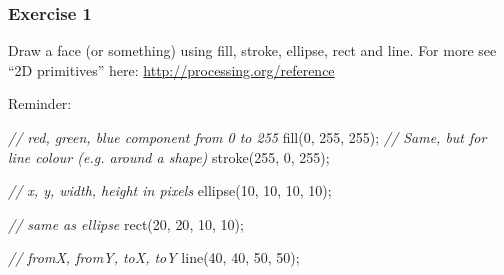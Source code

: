 \documentclass[ignorenonframetext,]{beamer}
\newenvironment{Shaded}{}{}
\newcommand{\DecValTok}[1]{\textcolor[rgb]{0.25,0.63,0.44}{{#1}}}
\newcommand{\CommentTok}[1]{\textcolor[rgb]{0.38,0.63,0.69}{\textit{{#1}}}}
\newcommand{\FunctionTok}[1]{\textcolor[rgb]{0.02,0.16,0.49}{{#1}}}
\newcommand{\NormalTok}[1]{{#1}}
\begin{document}
\begin{frame}[fragile]\frametitle{Exercise 1}

Draw a face (or something) using fill, stroke, ellipse, rect and line.
For more see ``2D primitives'' here:
\url{http://processing.org/reference}

Reminder:

\begin{Shaded}
\begin{Highlighting}[]
\CommentTok{// red, green, blue component from 0 to 255}
\FunctionTok{fill}\NormalTok{(}\DecValTok{0}\NormalTok{, }\DecValTok{255}\NormalTok{, }\DecValTok{255}\NormalTok{);}
\CommentTok{// Same, but for line colour (e.g. around a shape)}
\FunctionTok{stroke}\NormalTok{(}\DecValTok{255}\NormalTok{, }\DecValTok{0}\NormalTok{, }\DecValTok{255}\NormalTok{);}

\CommentTok{// x, y, width, height in pixels}
\FunctionTok{ellipse}\NormalTok{(}\DecValTok{10}\NormalTok{, }\DecValTok{10}\NormalTok{, }\DecValTok{10}\NormalTok{, }\DecValTok{10}\NormalTok{);}

\CommentTok{// same as ellipse}
\FunctionTok{rect}\NormalTok{(}\DecValTok{20}\NormalTok{, }\DecValTok{20}\NormalTok{, }\DecValTok{10}\NormalTok{, }\DecValTok{10}\NormalTok{);}

\CommentTok{// fromX, fromY, toX, toY}
\FunctionTok{line}\NormalTok{(}\DecValTok{40}\NormalTok{, }\DecValTok{40}\NormalTok{, }\DecValTok{50}\NormalTok{, }\DecValTok{50}\NormalTok{);}
\end{Highlighting}
\end{Shaded}

\end{frame}
\end{document}
